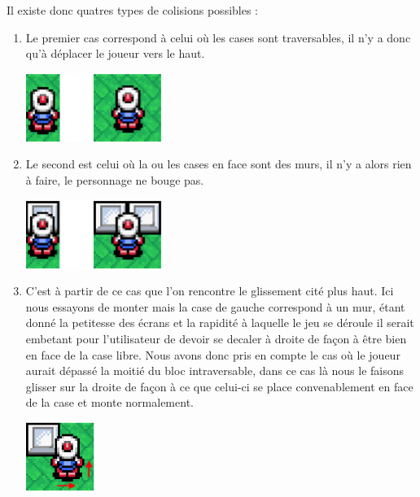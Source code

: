 \begin{enumerate}
				  		Il existe donc quatres types de colisions possibles :
				  		
				  		\begin{enumerate}

				  		  \item Le premier cas correspond à celui où les cases sont
				  		  traversables, il n'y a donc qu'à déplacer le joueur vers le haut.

							\begin{center}						
								\includegraphics[width=168px,height=84px]{Developpement/Img/ok2.eps}
							\end{center}

				  		  \item Le second est celui où la ou les cases en face sont des murs, il
				  		  n'y a alors rien à faire, le personnage ne bouge pas.
				  		  				  		  
				  		  	\begin{center}						
								\includegraphics[width=168px,height=84px]{Developpement/Img/ko2.eps}
							\end{center}
							
				  		  \item C'est à partir de ce cas que l'on rencontre le glissement cité
				  		  plus haut.
				  		  Ici nous essayons de monter mais la case de gauche correspond à un
				  		  mur, étant donné la petitesse des écrans et la rapidité à laquelle le
				  		  jeu se déroule il serait embetant pour l'utilisateur de devoir se
				  		  decaler à droite de façon à être bien en face de la case libre.
				  		  Nous avons donc pris en compte le cas où le joueur aurait dépassé la
				  		  moitié du bloc intraversable, dans ce cas là nous le faisons glisser
				  		  sur la droite de façon à ce que celui-ci se place convenablement en
				  		  face de la case et monte normalement.
				  		  
				  		  	\begin{center}						
								\includegraphics[width=84px,height=84px]{Developpement/Img/ko3.eps}
							\end{center}
				  		  

\end{enumerate}
\end{enumerate}

